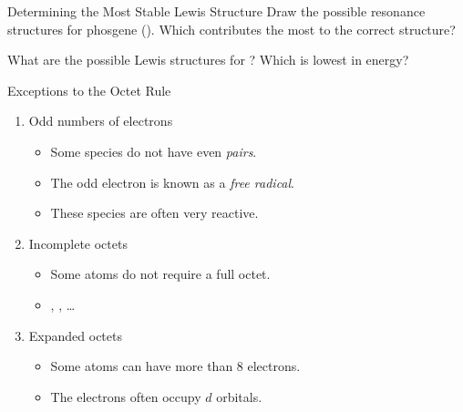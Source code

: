 \documentclass[notes=hide]{beamer}
\begin{document}
\begin{frame}[t]{Determining the Most Stable Lewis Structure}
	Draw the possible resonance structures for phosgene (). Which
	contributes the most to the correct structure?



\end{frame}

\begin{onyourown}{14em}
	What are the possible Lewis structures for ? Which is lowest in
	energy?
\end{onyourown}

\begin{frame}{Exceptions to the Octet Rule}
	\begin{enumerate}[<+(1)->]
		\item Odd numbers of electrons
			\begin{itemize}[<1->]
				\item Some species do not have even
					\emph{pairs}.
				\item The odd electron is known as a \emph{free
					radical}.
				\item These species are often very reactive.
			\end{itemize}
		\item Incomplete octets
			\begin{itemize}[<1->]
				\item Some atoms do not require a full octet.
				\item {}, , \ldots
			\end{itemize}
		\item Expanded octets
			\begin{itemize}[<1->]
				\item Some atoms can have more than 8 electrons.
				\item The electrons often occupy $d$ orbitals.
			\end{itemize}
	\end{enumerate}
\end{frame}
\end{document}
